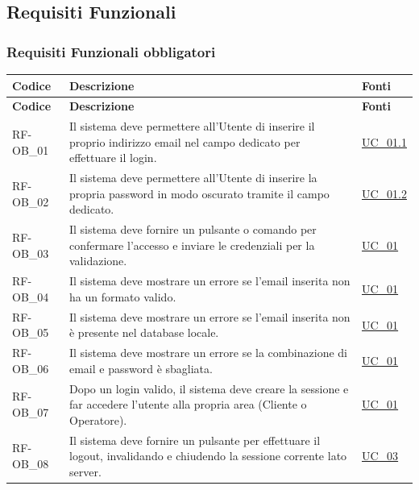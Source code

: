 \subsection{Requisiti Funzionali}

\subsubsection{Requisiti Funzionali obbligatori}
\renewcommand{\arraystretch}{1.15}
\begin{longtable}{|>{\raggedright}p{}|>{\raggedright\arraybackslash}p{}|>{\raggedright\arraybackslash}p{}|}
    \hline
    \rowcolor[gray]{0.9}
    \textbf{Codice} & \textbf{Descrizione} & \textbf{Fonti} \\
    \hline
    \endfirsthead
    \hline
    \rowcolor[gray]{0.9}
    \textbf{Codice} & \textbf{Descrizione} & \textbf{Fonti} \\
    \hline
    \endhead
    \hline
    RF-OB\_01 \hypertarget{rf-ob_1} & Il sistema deve permettere all'Utente di inserire il proprio indirizzo email nel campo dedicato per effettuare il login. & \hyperref[uc_01.1]{UC\_01.1} \\
    \hline
    RF-OB\_02 \hypertarget{rf-ob_2} & Il sistema deve permettere all'Utente di inserire la propria password in modo oscurato tramite il campo dedicato. & \hyperref[uc_01.2]{UC\_01.2} \\
    \hline
    RF-OB\_03 \hypertarget{rf-ob_3} & Il sistema deve fornire un pulsante o comando per confermare l'accesso e inviare le credenziali per la validazione. & \hyperref[uc_01]{UC\_01} \\
    \hline
    RF-OB\_04 \hypertarget{rf-ob_4} & Il sistema deve mostrare un errore se l'email inserita non ha un formato valido. & \hyperref[uc_01]{UC\_01} \\
    \hline
    RF-OB\_05 \hypertarget{rf-ob_5} & Il sistema deve mostrare un errore se l'email inserita non è presente nel database locale. & \hyperref[uc_01]{UC\_01} \\
    \hline
    RF-OB\_06 \hypertarget{rf-ob_6} & Il sistema deve mostrare un errore se la combinazione di email e password è sbagliata. & \hyperref[uc_01]{UC\_01} \\
    \hline
    RF-OB\_07 \hypertarget{rf-ob_7} & Dopo un login valido, il sistema deve creare la sessione e far accedere l'utente alla propria area (Cliente o Operatore). & \hyperref[uc_01]{UC\_01} \\
    \hline
    RF-OB\_08 \hypertarget{rf-ob_8} & Il sistema deve fornire un pulsante per effettuare il logout, invalidando e chiudendo la sessione corrente lato server. & \hyperref[uc_03]{UC\_03} \\

\end{longtable}

